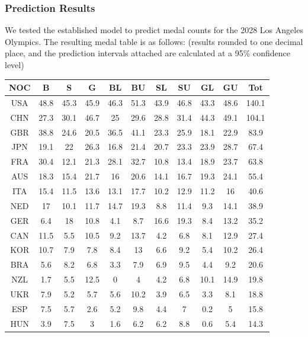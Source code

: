 \documentclass{mcmthesis}
\begin{document}
\subsubsection{Prediction Results}
We tested the established model to predict medal counts for the 2028 Los Angeles Olympics. The resulting medal table is as follows: (results rounded to one decimal place, and the prediction intervals attached are calculated at a 95\% confidence level)

\begin{table}[htbp]
    \centering
    \begin{tabular}{|c|c|c|c|c|c|c|c|c|c|c|}
        \hline
        NOC & B & S & G & BL & BU & SL & SU & GL & GU & Tot \\
        \hline
        USA & 48.8 & 45.3 & 45.9 & 46.3 & 51.3 & 43.9 & 46.8 & 43.3 & 48.6 & 140.1 \\
        CHN & 27.3 & 30.1 & 46.7 & 25 & 29.6 & 28.8 & 31.4 & 44.3 & 49.1 & 104.1 \\
        GBR & 38.8 & 24.6 & 20.5 & 36.5 & 41.1 & 23.3 & 25.9 & 18.1 & 22.9 & 83.9 \\
        JPN & 19.1 & 22 & 26.3 & 16.8 & 21.4 & 20.7 & 23.3 & 23.9 & 28.7 & 67.4 \\
        FRA & 30.4 & 12.1 & 21.3 & 28.1 & 32.7 & 10.8 & 13.4 & 18.9 & 23.7 & 63.8 \\
        AUS & 18.3 & 15.4 & 21.7 & 16 & 20.6 & 14.1 & 16.7 & 19.3 & 24.1 & 55.4 \\
        ITA & 15.4 & 11.5 & 13.6 & 13.1 & 17.7 & 10.2 & 12.9 & 11.2 & 16 & 40.6 \\
        NED & 17 & 10.1 & 11.7 & 14.7 & 19.3 & 8.8 & 11.4 & 9.3 & 14.1 & 38.9 \\
        GER & 6.4 & 18 & 10.8 & 4.1 & 8.7 & 16.6 & 19.3 & 8.4 & 13.2 & 35.2 \\
        CAN & 11.5 & 5.5 & 10.5 & 9.2 & 13.7 & 4.2 & 6.8 & 8.1 & 12.9 & 27.4 \\
        KOR & 10.7 & 7.9 & 7.8 & 8.4 & 13 & 6.6 & 9.2 & 5.4 & 10.2 & 26.4 \\
        BRA & 5.6 & 8.2 & 6.8 & 3.3 & 7.9 & 6.9 & 9.5 & 4.4 & 9.2 & 20.6 \\
        NZL & 1.7 & 5.5 & 12.5 & 0 & 4 & 4.2 & 6.8 & 10.1 & 14.9 & 19.8 \\
        UKR & 7.9 & 5.2 & 5.7 & 5.6 & 10.2 & 3.9 & 6.5 & 3.3 & 8.1 & 18.8 \\
        ESP & 7.5 & 5.7 & 2.6 & 5.2 & 9.8 & 4.4 & 7 & 0.2 & 5 & 15.8 \\
        HUN & 3.9 & 7.5 & 3 & 1.6 & 6.2 & 6.2 & 8.8 & 0.6 & 5.4 & 14.3 \\

\end{tabular}
\end{table}
\end{document}
